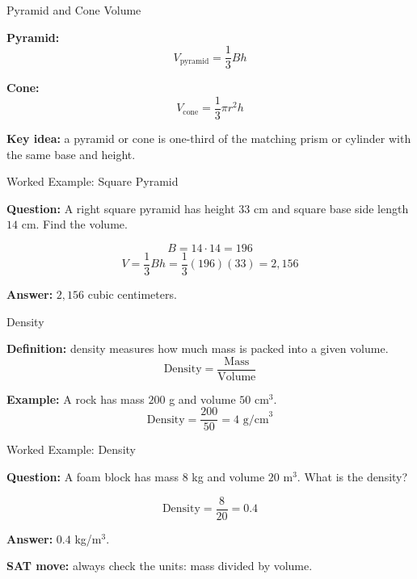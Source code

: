\documentclass{beamer}
\begin{document}
\begin{frame}{Pyramid and Cone Volume}

\textbf{Pyramid:}
\[
V_{\text{pyramid}} = \dfrac{1}{3}Bh
\]

\textbf{Cone:}
\[
V_{\text{cone}} = \dfrac{1}{3}\pi r^2h
\]

\vspace{0.15cm}
\textbf{Key idea:} a pyramid or cone is one-third of the matching prism or cylinder with the same base and height.

\end{frame}

\begin{frame}{Worked Example: Square Pyramid}

\textbf{Question:} A right square pyramid has height $33$ cm and square base side length $14$ cm. Find the volume.

\vspace{0.2cm}
\[
B = 14\cdot 14 = 196
\]
\[
V = \dfrac{1}{3}Bh = \dfrac{1}{3}(196)(33)=2{,}156
\]

\textbf{Answer:} $\boxed{2{,}156}$ cubic centimeters.

\end{frame}

\begin{frame}{Density}

\textbf{Definition:} density measures how much mass is packed into a given volume.
\[
\text{Density} = \dfrac{\text{Mass}}{\text{Volume}}
\]

\vspace{0.2cm}
\textbf{Example:} A rock has mass $200$ g and volume $50\text{ cm}^3$.
\[
\text{Density}=\dfrac{200}{50}=4\text{ g/cm}^3
\]

\end{frame}

\begin{frame}{Worked Example: Density}

\textbf{Question:} A foam block has mass $8$ kg and volume $20\text{ m}^3$. What is the density?

\vspace{0.2cm}
\[
\text{Density}=\dfrac{8}{20}=0.4
\]

\textbf{Answer:} $\boxed{0.4}$ kg/m$^3$.

\vspace{0.2cm}
\textbf{SAT move:} always check the units: mass divided by volume.

\end{frame}
\end{document}
